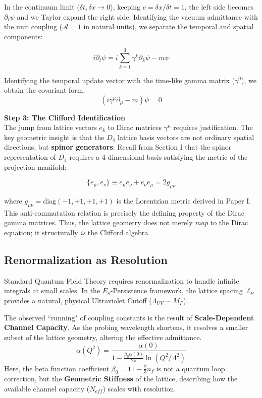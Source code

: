 In the continuum limit ($\delta t, \delta x \to 0$), keeping $c = \delta x / \delta t = 1$, the left side becomes $\partial_t \psi$ and we Taylor expand the right side. Identifying the vacuum admittance with the unit coupling ($\mathcal{A} = 1$ in natural units), we separate the temporal and spatial components:

\begin{equation}
    i\partial_t \psi = i\sum_{k=1}^{3} \gamma^k \partial_k \psi - m\psi
\end{equation}

Identifying the temporal update vector with the time-like gamma matrix ($\gamma^0$), we obtain the covariant form:
\begin{equation}
    (i\gamma^\mu \partial_\mu - m)\psi = 0
\end{equation}

\textbf{Step 3: The Clifford Identification} \\
The jump from lattice vectors $e_k$ to Dirac matrices $\gamma^\mu$ requires justification. The key geometric insight is that the $D_4$ lattice basis vectors are not ordinary spatial directions, but \textbf{spinor generators}. Recall from Section I that the spinor representation of $D_4$ requires a 4-dimensional basis satisfying the metric of the projection manifold:

\begin{equation}
    \{e_\mu, e_\nu\} \equiv e_\mu e_\nu + e_\nu e_\mu = 2g_{\mu\nu}
\end{equation}

where $g_{\mu\nu} = \text{diag}(-1,+1,+1,+1)$ is the Lorentzian metric derived in Paper I. This anti-commutation relation is precisely the defining property of the Dirac gamma matrices. Thus, the lattice geometry does not merely \textit{map} to the Dirac equation; it structurally \textit{is} the Clifford algebra.

\subsection{Renormalization as Resolution}
Standard Quantum Field Theory requires renormalization to handle infinite integrals at small scales. In the $E_8$-Persistence framework, the lattice spacing $\ell_P$ provides a natural, physical Ultraviolet Cutoff ($\Lambda_{UV} \sim M_P$).

The observed ``running" of coupling constants is the result of \textbf{Scale-Dependent Channel Capacity}. As the probing wavelength shortens, it resolves a smaller subset of the lattice geometry, altering the effective admittance.
\begin{equation}
    \alpha(Q^2) = \frac{\alpha(0)}{1 - \frac{\beta_0 \alpha(0)}{2\pi} \ln(Q^2/\Lambda^2)}
\end{equation}
Here, the beta function coefficient $\beta_0 = 11 - \frac{2}{3}n_f$ is not a quantum loop correction, but the \textbf{Geometric Stiffness} of the lattice, describing how the available channel capacity ($N_{eff}$) scales with resolution. 


